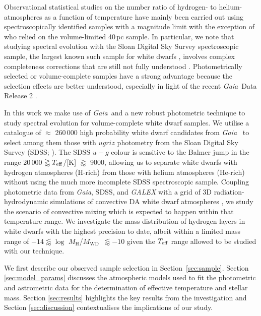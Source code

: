 \documentclass[a4paper,fleqn,usenatbib]{mnras}
\newcommand{\Mwd}{$M_{\mathrm{WD}}$}
\newcommand{\MH}{$M_{\mathrm{H}}$}
\newcommand{\gaia}{{\it Gaia}}
\begin{document}
Observational statistical studies on the number ratio of hydrogen- to helium-atmospheres as a function of temperature have mainly been carried out using spectroscopically identified samples with a magnitude limit \citep{bergeron97,bergeron01,tremblay08,blouin19,ourique19,genest-Beaulieu19} with the exception of \citet{limoges15} who relied on the volume-limited 40\,pc sample. In particular, we note that studying spectral evolution with the Sloan Digital Sky Survey spectroscopic sample, the largest known such sample for white dwarfs \citep{kepler19}, involves complex completeness corrections that are still not fully understood \citep{ngf15}. Photometrically selected or volume-complete samples have a strong advantage because the selection effects are better understood, especially in light of the recent \gaia\ Data Release 2 \citep{gaia2016,gaia-dr2}.

In this work we make use of \gaia\ and a new robust photometric technique to study spectral evolution for volume-complete white dwarf samples. We utilise a catalogue of $\approx$ 260\,000 high probability white dwarf candidates from \gaia\ \citep{ngf19} to select among them those with $ugriz$ photometry from the Sloan Digital Sky Survey (SDSS; \citealt{blanton17}). The SDSS $u-g$ colour is sensitive to the Balmer jump in the range 20\,000 $\gtrapprox T_{\rm eff}$/[K] $\gtrapprox$ 9000, allowing us to separate white dwarfs with hydrogen atmospheres (H-rich) from those with helium atmospheres (He-rich) without using the much more incomplete SDSS spectroscopic sample. Coupling photometric data from \gaia, SDSS, and {\it GALEX} with a grid of 3D radiation-hydrodynamic simulations of convective DA white dwarf atmospheres \citep{tremblay13c,cunningham19}, we study the scenario of convective mixing which is expected to happen within that temperature range. We investigate the mass distribution of hydrogen layers in white dwarfs with the highest precision to date, albeit within a limited mass range of $-14 \lessapprox \log$ \MH/\Mwd\ $\lessapprox -10$ given the $T_{\rm eff}$ range allowed to be studied with our technique.

We first describe our observed sample selection in Section~\ref{sec:sample}. Section \ref{sec:model_params} discusses the atmospheric models used to fit the photometric and astrometric data for the determination of effective temperature and stellar mass. Section \ref{sec:results} highlights the key results from the investigation and Section \ref{sec:discussion} contextualises the implications of our study.
\end{document}
